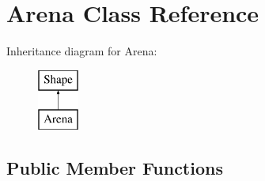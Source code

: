 \hypertarget{class_arena}{}\section{Arena Class Reference}
\label{class_arena}
Inheritance diagram for Arena\+:\begin{figure}[H]
\begin{center}
\leavevmode
\includegraphics[height=2.000000cm]{class_arena}
\end{center}
\end{figure}
\subsection*{Public Member Functions}
